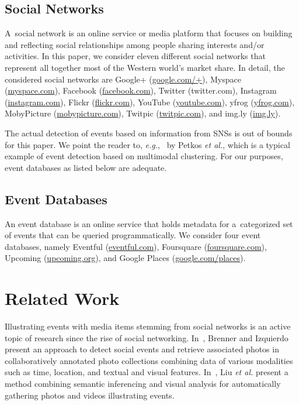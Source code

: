 \documentclass{acm_proc_article-sp}
\let\oldemph\emph
\renewcommand{\emph}[1]{\oldemph{\fontsize{9}{9}\selectfont #1}}
\begin{document}
\subsection{Social Networks}
A~social network is an online service or media platform that focuses on building
and reflecting social relationships among people sharing interests and/or activities.
In this paper, we consider eleven different social networks
that represent all together most of the Western world's market share.
In detail, the considered social networks are
\mbox{Google+} (\url{google.com/+}),
Myspace (\url{myspace.com}),
Facebook (\url{facebook.com}),
Twitter ({twitter.com}),
Instagram (\url{instagram.com}),
Flickr (\url{flickr.com}),
YouTube (\url{youtube.com}),
yfrog (\url{yfrog.com}),
MobyPicture (\url{mobypicture.com}),
Twitpic (\url{twitpic.com}), and
\mbox{img.ly} (\url{img.ly}).

The actual detection of events based on information from SNSs
is out of bounds for this paper.
We point the reader to, \emph{e.g.},~\cite{Petkos2012} by Petkos \emph{et al.},
which is a typical example of event detection based on multimodal clustering.
For our purposes, event databases as listed below are adequate.
 
\subsection{Event Databases}
An event database is an online service that holds metadata
for a~categorized set of events that can be queried programmatically.
We consider four event databases, namely
Eventful (\url{eventful.com}),
Foursquare (\url{foursquare.com}),
Upcoming (\url{upcoming.org}), and
Google Places (\url{google.com/places}).

\section{Related Work}
Illustrating events with media items stemming from social networks
is an active topic of research since the rise of social networking.
In~\cite{Brenner2012}, Brenner and Izquierdo present
an approach to detect social events and retrieve associated photos
in collaboratively annotated photo collections combining data of various modalities
such as time, location, and textual and visual features.
In~\cite{Liu2011}, Liu \emph{et al.} present a method
combining semantic inferencing and visual analysis for automatically gathering
photos and videos illustrating events.
\end{document}
